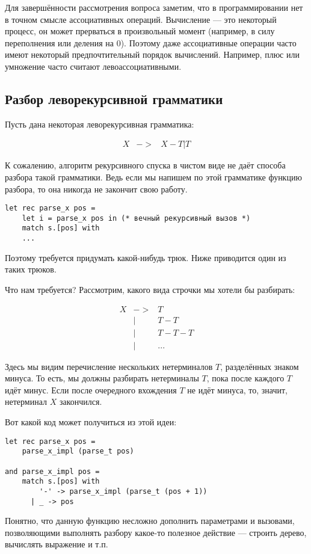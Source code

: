 \documentclass[12pt]{article}
\begin{document}
Для завершённости рассмотрения вопроса заметим, что в программировании нет в точном смысле 
ассоциативных операций. Вычисление --- это некоторый процесс, он может прерваться в 
произвольный момент (например, в силу переполнения или деления на 0). Поэтому даже 
ассоциативные операции часто имеют некоторый предпочтительный порядок вычислений.
Например, плюс или умножение часто считают левоассоциативными.

\subsection{Разбор леворекурсивной грамматики}

Пусть дана некоторая леворекурсивная грамматика:
\begin{bnf}\begin{eqnarray*}
X &->& X-T | T
\end{eqnarray*}\end{bnf}

К сожалению, алгоритм рекурсивного спуска в чистом виде не даёт способа разбора такой грамматики.
Ведь если мы напишем по этой грамматике функцию разбора, то она никогда не закончит свою работу.
\begin{verbatim}
let rec parse_x pos =
    let i = parse_x pos in (* вечный рекурсивный вызов *)
    match s.[pos] with
    ...
\end{verbatim}
Поэтому требуется придумать какой-нибудь трюк. Ниже приводится один из таких трюков.

Что нам требуется? Рассмотрим, какого вида строчки мы хотели бы разбирать:
\begin{bnf}\begin{eqnarray*}
X &->& T\\
  &|& T-T\\
  &|& T-T-T\\
  &|& ...
\end{eqnarray*}\end{bnf}

Здесь мы видим перечисление нескольких нетерминалов $T$, разделённых знаком минуса.
То есть, мы должны разбирать нетерминалы $T$, пока после каждого $T$ идёт минус.
Если после очередного вхождения $T$ не идёт минуса, то, значит, нетерминал $X$ закончился.

Вот какой код может получиться из этой идеи:

\begin{verbatim}
let rec parse_x pos =
    parse_x_impl (parse_t pos)

and parse_x_impl pos =
    match s.[pos] with
        '-' -> parse_x_impl (parse_t (pos + 1))
      | _ -> pos
\end{verbatim}

Понятно, что данную функцию несложно дополнить параметрами и вызовами, позволяющими
выполнять разбору какое-то полезное действие --- строить дерево, вычислять выражение
и т.п.

%
\end{document}
